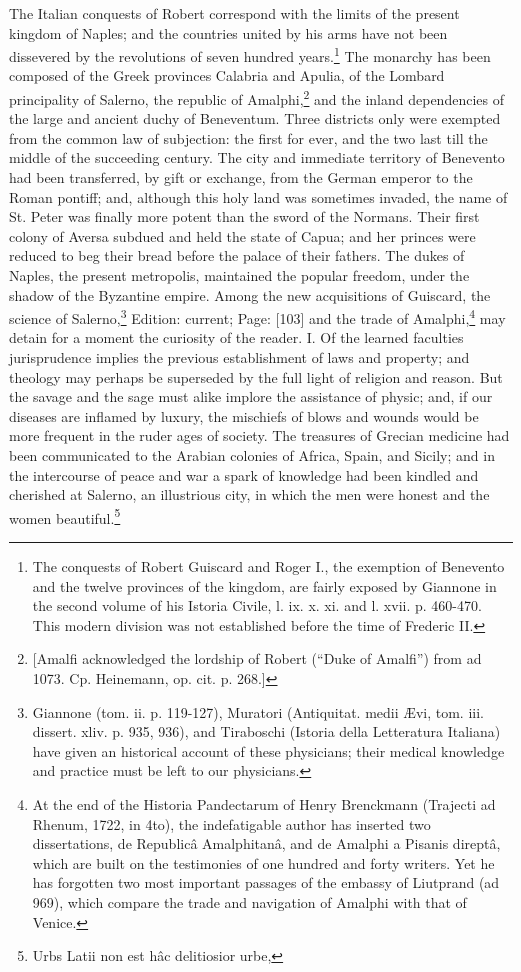 The Italian conquests of Robert correspond with the limits of the present kingdom of Naples; and the countries united by his arms have not been dissevered by the revolutions of seven hundred years.\footnote{The conquests of Robert Guiscard and Roger I., the exemption of Benevento and the twelve provinces of the kingdom, are fairly exposed by Giannone in the second volume of his Istoria Civile, l. ix. x. xi. and l. xvii. p. 460-470. This modern division was not established before the time of Frederic II.} The monarchy has been composed of the Greek provinces Calabria and Apulia, of the Lombard principality of Salerno, the republic of Amalphi,\footnote{[Amalfi acknowledged the lordship of Robert (\texthebrew{“}Duke of Amalfi\texthebrew{}”) from ad 1073. Cp. Heinemann, op. cit. p. 268.]} and the inland dependencies of the large and ancient duchy of Beneventum. Three districts only were exempted from the common law of subjection: the first for ever, and the two last till the middle of the succeeding century. The city and immediate territory of Benevento had been transferred, by gift or exchange, from the German emperor to the Roman pontiff; and, although this holy land was sometimes invaded, the name of St. Peter was finally more potent than the sword of the Normans. Their first colony of Aversa subdued and held the state of Capua; and her princes were reduced to beg their bread before the palace of their fathers. The dukes of Naples, the present metropolis, maintained the popular freedom, under the shadow of the Byzantine empire. Among the new acquisitions of Guiscard, the science of Salerno,\footnote{Giannone (tom. ii. p. 119-127), Muratori (Antiquitat. medii Ævi, tom. iii. dissert. xliv. p. 935, 936), and Tiraboschi (Istoria della Letteratura Italiana) have given an historical account of these physicians; their medical knowledge and practice must be left to our physicians.} Edition: current; Page: [103] and the trade of Amalphi,\footnote{At the end of the Historia Pandectarum of Henry Brenckmann (Trajecti ad Rhenum, 1722, in 4to), the indefatigable author has inserted two dissertations, de Republicâ Amalphitanâ, and de Amalphi a Pisanis direptâ, which are built on the testimonies of one hundred and forty writers. Yet he has forgotten two most important passages of the embassy of Liutprand (ad 969), which compare the trade and navigation of Amalphi with that of Venice.} may detain for a moment the curiosity of the reader. I. Of the learned faculties jurisprudence implies the previous establishment of laws and property; and theology may perhaps be superseded by the full light of religion and reason. But the savage and the sage must alike implore the assistance of physic; and, if our diseases are inflamed by luxury, the mischiefs of blows and wounds would be more frequent in the ruder ages of society. The treasures of Grecian medicine had been communicated to the Arabian colonies of Africa, Spain, and Sicily; and in the intercourse of peace and war a spark of knowledge had been kindled and cherished at Salerno, an illustrious city, in which the men were honest and the women beautiful.\footnote{Urbs Latii non est hâc delitiosior urbe,

}
